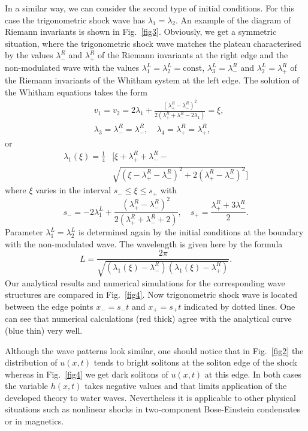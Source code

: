 \documentclass[pre,aps,superscriptaddress,twocolumn,floatfix]{revtex4-1}
\newcommand{\la}{\lambda}
\begin{document}
In a similar way, we can consider the second type of initial conditions.
For this case the trigonometric shock wave has $\la_1=\la_2$. An example of
the diagram of Riemann invariants is shown in Fig.~\ref{fig3}. Obviously,
we get a symmetric situation, where the trigonometric shock wave matches the plateau
characterised by the values $\la_-^R$ and $\la_+^R$ of the Riemann invariants 
at the right edge and the non-modulated
wave with the values $\la_1^L=\la_2^L=\mathrm{const}$, $\la_3^L=\la_-^R$ and $\la_2^L=\la_+^R$
of the Riemann invariants of the Whitham system
at the left edge. The solution of the Whitham equations takes the form
\begin{equation}\label{284.2}
\begin{split}
& v_1=v_2=2\la_1+\frac{(\la_+^R-\la_-^R)^2}{2(\la_+^R+\la_-^R-2\la_1)}=\xi,\\
& \la_3=\la_-^R=\la_-^R,\quad \la_4=\la_+^R=\la_+^R,
\end{split}
\end{equation}
or
\begin{equation}\label{285.2}
\begin{split}
\la_1(\xi)=\frac14 &
\bigg[\xi+\la_+^R+\la_-^R-\\
& \sqrt{(\xi-\la_+^R-\la_-^R)^2+2(\la_+^R-\la_-^R)^2}\bigg]
\end{split}
\end{equation}
where $\xi$ varies in the interval $s_-\leq \xi\leq s_+$ with
\begin{equation}\label{285.3}
s_-=-2\la_1^L+\frac{(\la_+^R-\la_-^R)^2}{2(\la_+^R+\la_-^R+2)},\quad
s_+=\frac{\la_+^R+3\la_-^R}{2}.
\end{equation}
Parameter $\la_1^L=\la_2^L$ is determined again by the initial conditions
at the boundary with the non-modulated wave. The wavelength is given here
by the formula
\begin{equation}\label{si4}
L=\frac{2\pi}{\sqrt{(\la_1(\xi)-\la_-^R)(\la_1(\xi)-\la_+^R)}}.
\end{equation}
Our analytical results and numerical simulations for the corresponding
wave structures are compared in Fig.~\ref{fig4}. Now trigonometric shock wave is
located between the edge points $x_-=s_-t$ and $x_+=s_+t$ indicated by dotted lines.
One can see that numerical calculations (red thick) agree with the analytical
curve (blue thin) very well.

Although the wave patterns look similar, one should notice that in Fig.~\ref{fig2}
the distribution of $u(x,t)$ tends to bright solitons at the soliton edge of the
shock whereas in Fig.~\ref{fig4} we get dark solitons of $u(x,t)$ at this edge.
In both cases the variable $h(x,t)$ takes negative values and that limits application
of the developed theory to water waves. Nevertheless it is applicable to other
physical situations such as nonlinear shocks in two-component Bose-Einstein
condensates or in magnetics.
\end{document}
